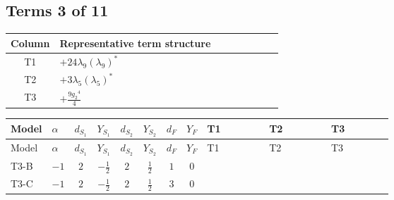 \documentclass[8pt]{article}
\begin{document}
\begin{landscape}
\subsection*{Terms 3 of 11}
\begin{center}
\begin{tabular}{@{}c >{\raggedright\arraybackslash}p{0.82\linewidth}@{}}
\toprule
Column & Representative term structure \\
\midrule
T1 & \(\displaystyle +24 {\lambda_{9}} \left({\lambda_{9}}\right)^{*}\) \\
\midrule
T2 & \(\displaystyle +3 {\lambda_5} \left({\lambda_5}\right)^{*}\) \\
\midrule
T3 & \(\displaystyle +\frac{9 {g_2}^4}{4}\) \\
\midrule
\bottomrule
\end{tabular}
\end{center}
\smallskip
\tiny
\begin{longtable}{@{}llcccccc >{\raggedright\arraybackslash}p{0.21\linewidth} >{\raggedright\arraybackslash}p{0.21\linewidth} >{\raggedright\arraybackslash}p{0.21\linewidth}@{}}
\toprule
Model & $\alpha$ & $d_{S_1}$ & $Y_{S_1}$ & $d_{S_2}$ & $Y_{S_2}$ & $d_F$ & $Y_F$ & T1 & T2 & T3 \\
\midrule
\endfirsthead
\toprule
Model & $\alpha$ & $d_{S_1}$ & $Y_{S_1}$ & $d_{S_2}$ & $Y_{S_2}$ & $d_F$ & $Y_F$ & T1 & T2 & T3 \\
\midrule
\endhead
T3-B & $-1$ & $2$ & $-\frac{1}{2}$ & $2$ & $\frac{1}{2}$ & $1$ & $0$ & \scriptsize\adjustbox{max width=\linewidth}{$\begin{gathered} +24 {\lambda_{9}} \left({\lambda_{9}}\right)^{*}\end{gathered}$} & \scriptsize\adjustbox{max width=\linewidth}{$\begin{gathered} +3 {\lambda_5} \left({\lambda_5}\right)^{*}\end{gathered}$} & \scriptsize\adjustbox{max width=\linewidth}{$\begin{gathered} +\frac{9 {g_2}^4}{4}\end{gathered}$} \\
\midrule
T3-C & $-1$ & $2$ & $-\frac{1}{2}$ & $2$ & $\frac{1}{2}$ & $3$ & $0$ & \scriptsize\adjustbox{max width=\linewidth}{$\begin{gathered} +24 {\lambda_{9}} \left({\lambda_{9}}\right)^{*}\end{gathered}$} & \scriptsize\adjustbox{max width=\linewidth}{$\begin{gathered} +3 {\lambda_5} \left({\lambda_5}\right)^{*}\end{gathered}$} & \scriptsize\adjustbox{max width=\linewidth}{$\begin{gathered} +\frac{9 {g_2}^4}{4}\end{gathered}$} \\

\end{longtable}
\end{landscape}
\end{document}
